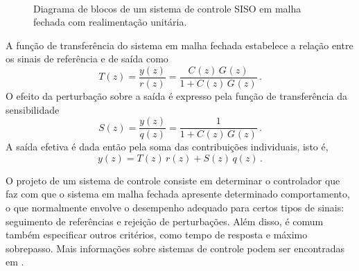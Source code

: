 \documentclass[repeatfields,oneside]{tcc}
\newcommand{\mycdot}{ \, }
\newcommand{\myC}[2][]{ C_{#1} \left( #2 \right) }
\newcommand{\myG}[2][]{ G_{#1} \left( #2 \right) }
\newcommand{\myCG}[3][]{ \myC[#1]{#2} \mycdot \myG[#1]{#3} }
\begin{document}
\begin{figure}[h]
    \centering
    \caption{Diagrama de blocos de um sistema de controle SISO em malha fechada com realimentação unitária.}
    \\
    \label{fig:feedbackloop}
\end{figure}

A função de transferência do sistema em malha fechada estabelece a relação entre os sinais de referência e de saída como
\begin{equation}\label{eq:T_loop}
    T(z) = \dfrac{ y(z) }{ r(z) } = \dfrac{ \myCG{z}{z} }{ 1 + \myCG{z}{z} }
    \,.
\end{equation}
O efeito da perturbação sobre a saída é expresso pela função de transferência da sensibilidade
\begin{equation}\label{eq:T_loop_qy}
    S(z) = \dfrac{ y(z) }{ q(z) } = \dfrac{ 1 }{ 1 + \myCG{z}{z} }
    \,.
\end{equation}
A saída efetiva é dada então pela soma das contribuições individuais, isto é,
\begin{equation}
    y(z) = T(z) \mycdot r(z) + S(z) \mycdot q(z)
    \,.
\end{equation}

O projeto de um sistema de controle consiste em determinar o controlador que faz com que o sistema em malha fechada apresente determinado comportamento, o que normalmente envolve o desempenho adequado para certos tipos de sinais: seguimento de referências e rejeição de perturbações.
Além disso, é comum também especificar outros critérios, como tempo de resposta e máximo sobrepasso.
Mais informações sobre sistemas de controle podem ser encontradas em \cite{Bazanella2005, Ogata2010}.
\end{document}
